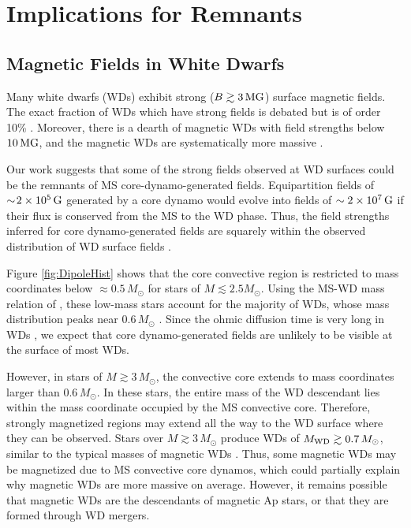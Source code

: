 \section{Implications for Remnants}
\label{remnants}

\subsection{Magnetic Fields in White Dwarfs}

Many white dwarfs (WDs) exhibit strong ($B \gtrsim 3 \, {\rm MG}$) surface magnetic fields. The exact fraction of WDs which have strong fields is debated but is of order 10\% \citep{Hollands_2015}. Moreover, there is a dearth of magnetic WDs with field strengths below $10 \, {\rm MG}$, and the magnetic WDs are systematically more massive \citep{Ferrario_2015B}.

Our work suggests that some of the strong fields observed at WD surfaces could be the remnants of MS core-dynamo-generated fields. Equipartition fields of $\sim \! 2 \times 10^5 \, {\rm G}$ generated by a core dynamo would evolve into fields of $\sim 2 \times 10^7 \, {\rm G}$ if their flux is conserved from the MS to the WD phase. Thus, the field strengths inferred for core dynamo-generated fields are squarely within the observed distribution of WD surface fields \citep{Ferrario_2015A,Ferrario_2015B}.

Figure \ref{fig:DipoleHist} shows that the core convective region is restricted to mass coordinates below $\approx 0.5 \, M_\odot$ for stars of $M \lesssim 2.5 M_\odot$. Using the MS-WD mass relation of \cite{Renedo_2010}, these low-mass stars account for the majority of WDs, whose mass distribution peaks near $0.6 \, M_\odot$ \citep{Rebassa-Mansergas_2015}. Since the ohmic diffusion time is very long in WDs \citep{Ferrario_2015B}, we expect that core dynamo-generated fields are unlikely to be visible at the surface of most WDs. 

However, in stars of $M \gtrsim 3 \, M_\odot$, the convective core extends to mass coordinates larger than $0.6 \, M_\odot$.  In these stars, the entire mass of the WD descendant lies within the mass coordinate occupied by the MS convective core. Therefore, strongly magnetized regions may extend all the way to the WD surface where they can be observed. Stars over $M \gtrsim 3 \, M_\odot$ produce WDs of $M_{\rm WD} \gtrsim 0.7 \, M_\odot$, similar to the typical masses of magnetic WDs \citep{Ferrario_2015B}. Thus, some magnetic WDs may be magnetized due to MS convective core dynamos, which could partially explain why magnetic WDs are more massive on average. However, it remains possible that magnetic WDs are the descendants of magnetic Ap stars, or that they are formed through WD mergers. 


